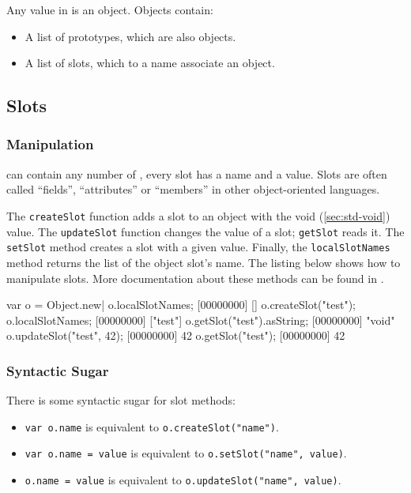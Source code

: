 Any value in \us is an object. Objects contain:

\begin{itemize}
\item A list of prototypes, which are also objects.
\item A list of slots, which to a name associate an object.
\end{itemize}

\subsection{Slots}

\subsubsection{Manipulation}

 can contain any number of , every slot has a
name and a value. Slots are often called ``fields'', ``attributes'' or
``members'' in other object-oriented languages.

The \lstinline|createSlot| function adds a slot to an object with the
void (\autoref{sec:std-void}) value. The \lstinline|updateSlot|
function changes the value of a slot; \lstinline|getSlot| reads
it. The \lstinline|setSlot| method creates a slot with a given
value. Finally, the \lstinline|localSlotNames| method returns the list of
the object slot's name. The listing below shows how to manipulate
slots. More documentation about these methods can be found in
.

\begin{urbiscript}
var o = Object.new|
o.localSlotNames;
[00000000] []
o.createSlot("test");
o.localSlotNames;
[00000000] ["test"]
o.getSlot("test").asString;
[00000000] "void"
o.updateSlot("test", 42);
[00000000] 42
o.getSlot("test");
[00000000] 42
\end{urbiscript}

\subsubsection{Syntactic Sugar}

There is some syntactic sugar for slot methods:
\begin{itemize}
\item \lstinline|var o.name| is equivalent to
  \lstinline|o.createSlot("name")|.
\item \lstinline|var o.name = value| is equivalent to
  \lstinline|o.setSlot("name", value)|.
\item \lstinline|o.name = value| is equivalent to
  \lstinline|o.updateSlot("name", value)|.
\end{itemize}


